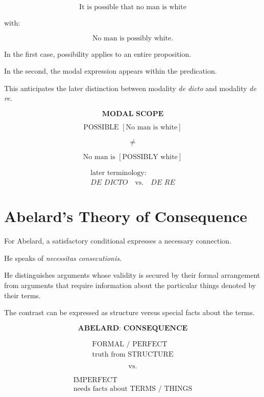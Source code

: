 \documentclass[11pt]{article}
\newcommand{\latin}[1]{\textit{#1}}
\begin{document}
\[
\text{It is possible that no man is white}
\]

with:

\[
\text{No man is possibly white.}
\]

In the first case, possibility applies to an entire proposition.

In the second, the modal expression appears within the
predication.

This anticipates the later distinction between modality
\latin{de dicto} and modality \latin{de re}.

\begin{whiteboard}
\[
\textbf{MODAL SCOPE}
\]

\[
\text{POSSIBLE }[\text{No man is white}]
\]

\[
\neq
\]

\[
\text{No man is }[\text{POSSIBLY white}]
\]

\[
\boxed{
\begin{array}{c}
\text{later terminology:}\\
\latin{DE DICTO}\quad \text{vs.}\quad \latin{DE RE}
\end{array}
}
\]
\end{whiteboard}

\section{Abelard's Theory of Consequence}

For Abelard, a satisfactory conditional expresses a necessary
connection.

He speaks of \latin{necessitas consecutionis}.

He distinguishes arguments whose validity is secured by their
formal arrangement from arguments that require information about
the particular things denoted by their terms.

The contrast can be expressed as structure versus special facts
about the terms.

\begin{whiteboard}
\[
\textbf{ABELARD: CONSEQUENCE}
\]

\[
\begin{array}{c}
\text{FORMAL / PERFECT}\\
\text{truth from STRUCTURE}
\end{array}
\]

\[
\text{vs.}
\]

\[
\begin{array}{c}
\text{IMPERFECT}\\
\text{needs facts about TERMS / THINGS}
\end{array}
\]
\end{whiteboard}
\end{document}
